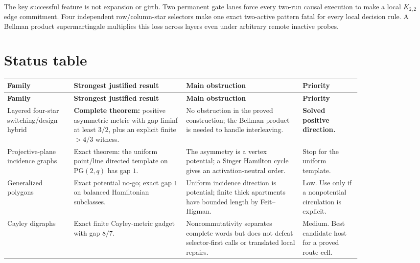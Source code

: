 \documentclass[11pt,a4paper]{article}
\renewcommand{\arraystretch}{1.15}
\begin{document}
The key successful feature is not expansion or girth.  Two permanent gate lanes force every two-run causal execution to make a local \(K_{2,2}\) edge commitment.  Four independent row/column-star selectors make one exact two-active pattern fatal for every local decision rule.  A Bellman product supermartingale multiplies this loss across layers even under arbitrary remote inactive probes.


\section*{Status table}

\begin{landscape}

\begingroup\small
\setlength{\tabcolsep}{3pt}
\renewcommand{\arraystretch}{1.25}
\begin{longtable}{>{\raggedright\arraybackslash}p{0.15\linewidth}>{\raggedright\arraybackslash}p{0.27\linewidth}>{\raggedright\arraybackslash}p{0.28\linewidth}>{\raggedright\arraybackslash}p{0.14\linewidth}}
\rowcolor{TableHead}
\textbf{Family} & \textbf{Strongest justified result} & \textbf{Main obstruction} & \textbf{Priority} \\
\hline
\endfirsthead
\rowcolor{TableHead}
\textbf{Family} & \textbf{Strongest justified result} & \textbf{Main obstruction} & \textbf{Priority} \\
\hline
\endhead
Layered four-star switching/design hybrid & \textbf{Complete theorem:} positive asymmetric metric with gap liminf at least \(3/2\), plus an explicit finite \(>4/3\) witness. & No obstruction in the proved construction; the Bellman product is needed to handle interleaving. & \textbf{Solved positive direction.} \\
\hline
Projective-plane incidence graphs & Exact theorem: the uniform point/line directed template on \(\mathrm{PG}(2,q)\) has gap \(1\). & The asymmetry is a vertex potential; a Singer Hamilton cycle gives an activation-neutral order. & Stop for the uniform template. \\
\hline
Generalized polygons & Exact potential no-go; exact gap \(1\) on balanced Hamiltonian subclasses. & Uniform incidence direction is potential; finite thick apartments have bounded length by Feit--Higman. & Low. Use only if a nonpotential circulation is explicit. \\
\hline
Cayley digraphs & Exact finite Cayley-metric gadget with gap \(8/7\). & Noncommutativity separates complete words but does not defeat selector-first calls or translated local repairs. & Medium. Best candidate host for a proved route cell. \\

\end{longtable}
\end{landscape}
\end{document}

